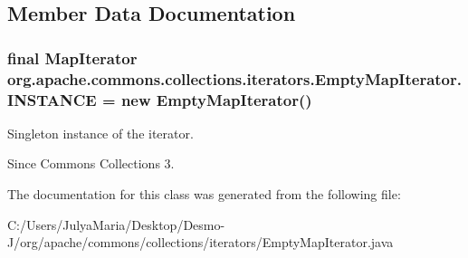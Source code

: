 \subsection{Member Data Documentation}
\subsubsection[{I\-N\-S\-T\-A\-N\-C\-E}]{\setlength{\rightskip}{0pt plus 5cm}final {\bf Map\-Iterator} org.\-apache.\-commons.\-collections.\-iterators.\-Empty\-Map\-Iterator.\-I\-N\-S\-T\-A\-N\-C\-E = new {\bf Empty\-Map\-Iterator}()\hspace{0.3cm}{\ttfamily [static]}}\label{classorg_1_1apache_1_1commons_1_1collections_1_1iterators_1_1_empty_map_iterator_ab6c7b7c031edc6b77d99f0a5a389cf27}
Singleton instance of the iterator. \begin{DoxySince}{Since}
Commons Collections 3. 
\end{DoxySince}


The documentation for this class was generated from the following file\-:\begin{DoxyCompactItemize}
\item 
C\-:/\-Users/\-Julya\-Maria/\-Desktop/\-Desmo-\/\-J/org/apache/commons/collections/iterators/Empty\-Map\-Iterator.\-java\end{DoxyCompactItemize}
